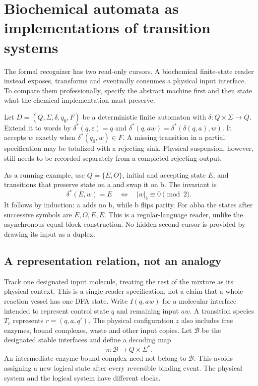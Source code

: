 \section{Biochemical automata as implementations of transition systems}
The formal recognizer has two read-only cursors. A biochemical finite-state
reader instead exposes, transforms and eventually consumes a physical input
interface. To compare them professionally, specify the abstract machine
first and then state what the chemical implementation must preserve.

Let $D=(Q,\Sigma,\delta,q_0,F)$ be a deterministic finite automaton with
$\delta:Q\times\Sigma\to Q$. Extend it to words by
$\delta^*(q,\varepsilon)=q$ and
$\delta^*(q,aw)=\delta^*(\delta(q,a),w)$. It accepts $w$ exactly when
$\delta^*(q_0,w)\in F$. A missing transition in a partial specification
may be totalized with a rejecting sink. Physical suspension, however, still
needs to be recorded separately from a completed rejecting output.

As a running example, use $Q=\{E,O\}$, initial and accepting state $E$,
and transitions that preserve state on a and swap it on b. The invariant is
\begin{equation}
 \delta^*(E,w)=E\quad\Longleftrightarrow\quad |w|_b\equiv0\pmod2.
\end{equation}
It follows by induction: a adds no b, while b flips parity. For abba the
states after successive symbols are $E,O,E,E$. This is a regular-language
reader, unlike the asynchronous equal-block construction. No hidden second
cursor is provided by drawing its input as a duplex.

\subsection{A representation relation, not an analogy}
Track one designated input molecule, treating the rest of the mixture as its
physical context. This is a single-reader specification, not a claim that a
whole reaction vessel has one DFA state.
Write $I(q,aw)$ for a molecular interface intended to represent control state
$q$ and remaining input $aw$. A transition species $T_r$ represents
$r=(q,a,q')$. The physical configuration $z$ also includes free enzymes,
bound complexes, waste and other input copies. Let $\mathcal B$ be the
designated stable interfaces and define a decoding map
\[
 \pi:\mathcal B\to Q\times\Sigma^*.
\]
An intermediate enzyme-bound complex need not belong to $\mathcal B$.
This avoids assigning a new logical state after every reversible binding event.
The physical system and the logical system have different clocks.

